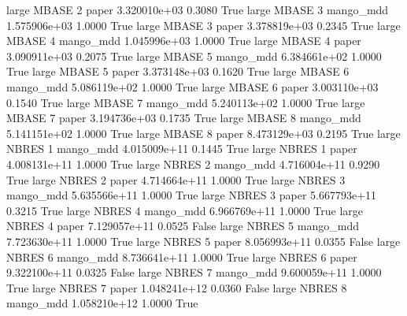      large    MBASE                 2                 paper 3.320010e+03      0.3080    True
     large    MBASE                 3             mango_mdd 1.575906e+03      1.0000    True
     large    MBASE                 3                 paper 3.378819e+03      0.2345    True
     large    MBASE                 4             mango_mdd 1.045996e+03      1.0000    True
     large    MBASE                 4                 paper 3.090911e+03      0.2075    True
     large    MBASE                 5             mango_mdd 6.384661e+02      1.0000    True
     large    MBASE                 5                 paper 3.373148e+03      0.1620    True
     large    MBASE                 6             mango_mdd 5.086119e+02      1.0000    True
     large    MBASE                 6                 paper 3.003110e+03      0.1540    True
     large    MBASE                 7             mango_mdd 5.240113e+02      1.0000    True
     large    MBASE                 7                 paper 3.194736e+03      0.1735    True
     large    MBASE                 8             mango_mdd 5.141151e+02      1.0000    True
     large    MBASE                 8                 paper 8.473129e+03      0.2195    True
     large    NBRES                 1             mango_mdd 4.015009e+11      0.1445    True
     large    NBRES                 1                 paper 4.008131e+11      1.0000    True
     large    NBRES                 2             mango_mdd 4.716004e+11      0.9290    True
     large    NBRES                 2                 paper 4.714664e+11      1.0000    True
     large    NBRES                 3             mango_mdd 5.635566e+11      1.0000    True
     large    NBRES                 3                 paper 5.667793e+11      0.3215    True
     large    NBRES                 4             mango_mdd 6.966769e+11      1.0000    True
     large    NBRES                 4                 paper 7.129057e+11      0.0525   False
     large    NBRES                 5             mango_mdd 7.723630e+11      1.0000    True
     large    NBRES                 5                 paper 8.056993e+11      0.0355   False
     large    NBRES                 6             mango_mdd 8.736641e+11      1.0000    True
     large    NBRES                 6                 paper 9.322100e+11      0.0325   False
     large    NBRES                 7             mango_mdd 9.600059e+11      1.0000    True
     large    NBRES                 7                 paper 1.048241e+12      0.0360   False
     large    NBRES                 8             mango_mdd 1.058210e+12      1.0000    True
